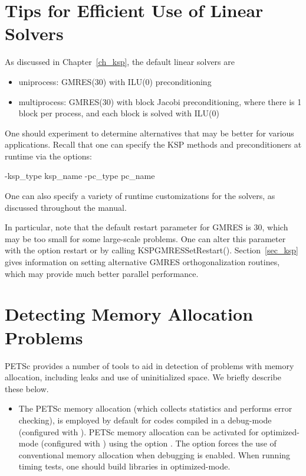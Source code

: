 {{\section{Tips for Efficient Use of Linear Solvers}
\label{sec_slestips}

As discussed in Chapter~\ref{ch_ksp}, the default linear solvers are
\begin{itemize}
\item uniprocess: GMRES(30) with ILU(0) preconditioning\\
\item multiprocess: GMRES(30) with block Jacobi preconditioning, where there
                     is 1 block per process, and each block is solved with ILU(0)\\
\end{itemize}
One should experiment to determine alternatives that may be better for
various applications.  Recall that one can specify the KSP methods and
preconditioners at runtime via the options:
\begin{tabbing}
   -ksp\_type \trl{<}ksp\_name\trl{>} -pc\_type \trl{<}pc\_name\trl{>}
\end{tabbing}
One can also specify a variety of runtime customizations for the
solvers, as discussed throughout the manual.

In particular, note that the default restart parameter for GMRES is
30, which may be too small for some large-scale problems.  One can alter this
parameter with the option  \trl{<}restart\trl{>} or by
calling KSPGMRESSetRestart(). Section~\ref{sec_ksp} gives
information on setting alternative GMRES orthogonalization routines,
which may provide much better parallel performance.

\section{Detecting Memory Allocation Problems}

PETSc provides a number of tools to aid in detection of problems
with memory allocation, including leaks and use of uninitialized space.
We briefly describe these below.
 

\begin{itemize}

\item The PETSc memory allocation (which collects statistics and
performs error checking), is employed by default for codes compiled in
a debug-mode (configured with ).  PETSc memory
allocation can be activated for optimized-mode (configured with
) using the option . The option
 forces the use of conventional memory allocation when
debugging is enabled.  When running timing tests, one should build
libraries in optimized-mode.


\end{itemize}}}

